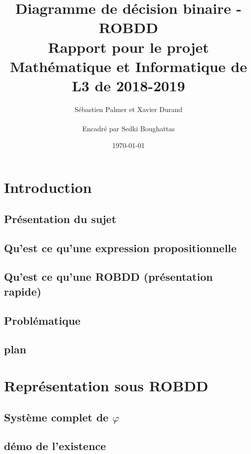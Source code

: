 \documentclass[a4paper, oneside]{report}
\begin{document}
\title{Diagramme de décision binaire - ROBDD \\ Rapport pour le projet Mathématique et Informatique de L3 de 2018-2019  }
\date{\today}
\author{Sébastien Palmer et Xavier Durand \\~\\ Encadré par Sedki Boughattas }
\maketitle

\tableofcontents{}

\newpage

\chapter*{Introduction}

\section*{Présentation du sujet}
\section*{Qu'est ce qu'une expression propositionnelle}
\section*{Qu'est ce qu'une ROBDD (présentation rapide)}
\section*{Problématique}
\section*{plan}


\chapter{Représentation sous ROBDD}

\section{Système complet de $\varphi$}
\section{démo de l'existence}
\end{document}
